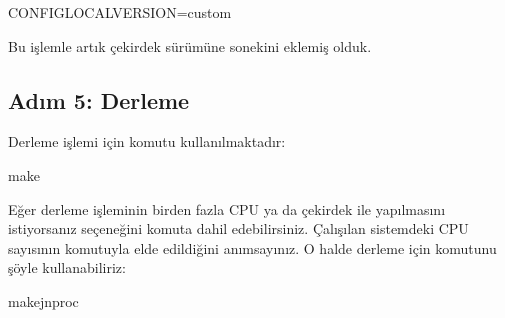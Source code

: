 \documentclass[a4paper,10pt,turkish]{sphinxmanual}
\begin{document}
\begin{sphinxVerbatim}[commandchars=\\\{\}]
CONFIG\PYGZus{}LOCALVERSION=\PYGZdq{}\PYGZhy{}custom\PYGZdq{}
\end{sphinxVerbatim}

\sphinxAtStartPar
Bu işlemle artık çekirdek sürümüne  sonekini eklemiş olduk.


\subsection{Adım 5: Derleme}
\label{\detokenize{kernelcompilation:adim-5-derleme}}
\sphinxAtStartPar
Derleme işlemi için  komutu kullanılmaktadır:

\begin{sphinxVerbatim}[commandchars=\\\{\}]
\PYGZdl{}make
\end{sphinxVerbatim}

\sphinxAtStartPar
Eğer derleme işleminin birden fazla CPU ya da çekirdek ile yapılmasını istiyorsanız
 seçeneğini komuta dahil edebilirsiniz. Çalışılan sistemdeki CPU sayısının 
komutuyla elde edildiğini anımsayınız. O halde derleme için  komutunu şöyle kullanabiliriz:

\begin{sphinxVerbatim}[commandchars=\\\{\}]
\PYGZdl{}make\PYGZhy{}jnproc
\end{sphinxVerbatim}
\end{document}
